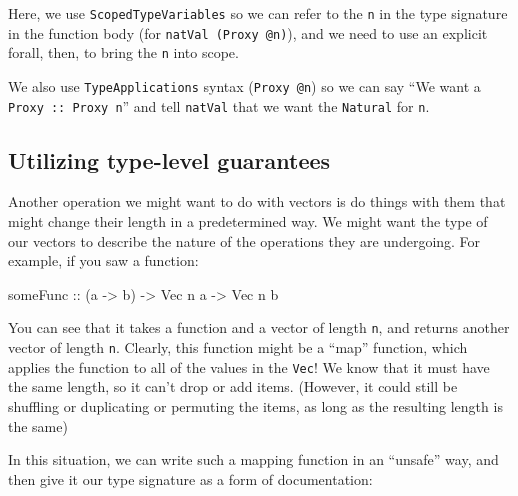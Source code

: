 \documentclass[]{article}
\newenvironment{Shaded}{}{}
\newcommand{\KeywordTok}[1]{\textcolor[rgb]{0.00,0.44,0.13}{\textbf{#1}}}
\newcommand{\DataTypeTok}[1]{\textcolor[rgb]{0.56,0.13,0.00}{#1}}
\newcommand{\CommentTok}[1]{\textcolor[rgb]{0.38,0.63,0.69}{\textit{#1}}}
\newcommand{\OtherTok}[1]{\textcolor[rgb]{0.00,0.44,0.13}{#1}}
\newcommand{\FunctionTok}[1]{\textcolor[rgb]{0.02,0.16,0.49}{#1}}
\newcommand{\NormalTok}[1]{#1}
\begin{document}
Here, we use \texttt{ScopedTypeVariables} so we can refer to the \texttt{n} in
the type signature in the function body (for \texttt{natVal\ (Proxy\ @n)}), and
we need to use an explicit forall, then, to bring the \texttt{n} into scope.

We also use \texttt{TypeApplications} syntax (\texttt{Proxy\ @n}) so we can say
``We want a \texttt{Proxy\ ::\ Proxy\ n}'' and tell \texttt{natVal} that we want
the \texttt{Natural} for \texttt{n}.

\subsection{Utilizing type-level
guarantees}\label{utilizing-type-level-guarantees}

Another operation we might want to do with vectors is do things with them that
might change their length in a predetermined way. We might want the type of our
vectors to describe the nature of the operations they are undergoing. For
example, if you saw a function:

\begin{Shaded}
\begin{Highlighting}[]
\OtherTok{someFunc ::}\NormalTok{ (a }\OtherTok{->}\NormalTok{ b) }\OtherTok{->} \DataTypeTok{Vec}\NormalTok{ n a }\OtherTok{->} \DataTypeTok{Vec}\NormalTok{ n b}
\end{Highlighting}
\end{Shaded}

You can see that it takes a function and a vector of length \texttt{n}, and
returns another vector of length \texttt{n}. Clearly, this function might be a
``map'' function, which applies the function to all of the values in the
\texttt{Vec}! We know that it must have the same length, so it can't drop or add
items. (However, it could still be shuffling or duplicating or permuting the
items, as long as the resulting length is the same)

In this situation, we can write such a mapping function in an ``unsafe'' way,
and then give it our type signature as a form of documentation:

\begin{Shaded}
\end{Shaded}
\end{document}
